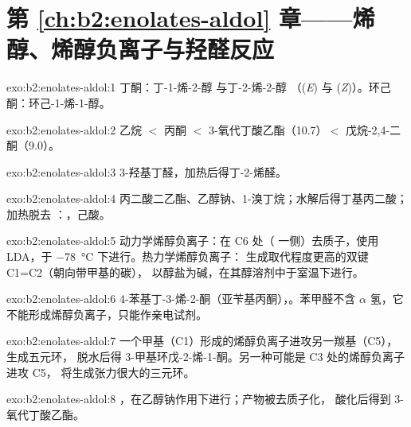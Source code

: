 \section*{第 \ref{ch:b2:enolates-aldol} 章——烯醇、烯醇负离子与羟醛反应}

\begin{solution}{exo:b2:enolates-aldol:1}
丁酮：丁-1-烯-2-醇  与丁-2-烯-2-醇 （(\textit{E}) 与
(\textit{Z})）。环己酮：环己-1-烯-1-醇。
\end{solution}

\begin{solution}{exo:b2:enolates-aldol:2}
乙烷 $<$ 丙酮 $<$ 3-氧代丁酸乙酯（10.7）$<$ 戊烷-2,4-二酮（9.0）。
\end{solution}

\begin{solution}{exo:b2:enolates-aldol:3}
3-羟基丁醛，加热后得丁-2-烯醛。
\end{solution}

\begin{solution}{exo:b2:enolates-aldol:4}
丙二酸二乙酯、乙醇钠、1-溴丁烷；水解后得丁基丙二酸；
加热脱去 ：，己酸。
\end{solution}

\begin{solution}{exo:b2:enolates-aldol:5}
动力学烯醇负离子：在 C6 处（ 一侧）去质子，使用 LDA，于 \qty{-78}{\degreeCelsius} 下进行。热力学烯醇负离子：
生成取代程度更高的双键 C1=C2（朝向带甲基的碳），
以醇盐为碱，在其醇溶剂中于室温下进行。
\end{solution}

\begin{solution}{exo:b2:enolates-aldol:6}
4-苯基丁-3-烯-2-酮（亚苄基丙酮），。苯甲醛不含 $\alpha$ 氢，它
不能形成烯醇负离子，只能作亲电试剂。
\end{solution}

\begin{solution}{exo:b2:enolates-aldol:7}
一个甲基（C1）形成的烯醇负离子进攻另一羰基（C5），生成五元环，
脱水后得 3-甲基环戊-2-烯-1-酮。另一种可能是 C3 处的烯醇负离子进攻 C5，
将生成张力很大的三元环。
\end{solution}

\begin{solution}{exo:b2:enolates-aldol:8}
，在乙醇钠作用下进行；产物被去质子化，
酸化后得到 3-氧代丁酸乙酯。
\end{solution}

